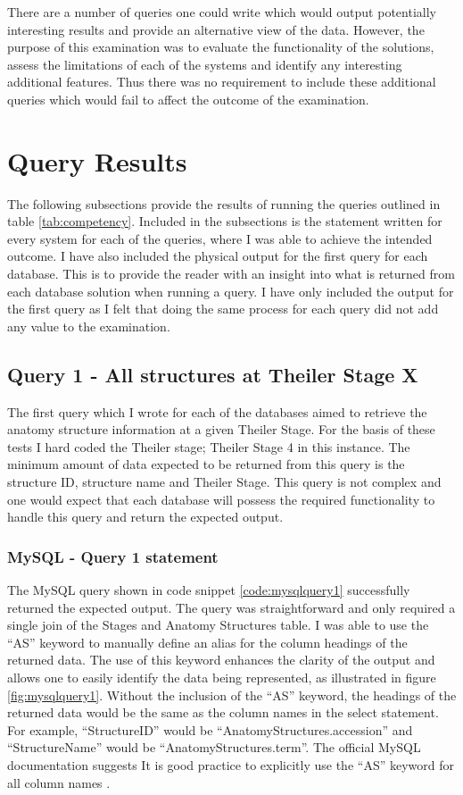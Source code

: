 There are a number of queries one could write which would output potentially interesting results and provide an alternative view of the data. However, the purpose of this examination was to evaluate the functionality of the solutions, assess the limitations of each of the systems and identify any interesting additional features. Thus there was no requirement to include these additional queries which would fail to affect the outcome of the examination.

\section{Query Results}\label{queryresults}
The following subsections provide the results of running the queries outlined in table \ref{tab:competency}. Included in the subsections is the statement written for every system for each of the queries, where I was able to achieve the intended outcome. I have also included the physical output for the first query for each database. This is to provide the reader with an insight into what is returned from each database solution when running a query. I have only included the output for the first query as I felt that doing the same process for each query did not add any value to the examination.

\subsection*{Query 1 - All structures at Theiler Stage X}\label{query1}
The first query which I wrote for each of the databases aimed to retrieve the anatomy structure information at a given Theiler Stage. For the basis of these tests I hard coded the Theiler stage; Theiler Stage 4 in this instance.  The minimum amount of data expected to be returned from this query is the structure ID, structure name and Theiler Stage. This query is not complex and one would expect that each database will possess the required functionality to handle this query and return the expected output.

\subsubsection*{MySQL - Query 1 statement}\label{mysqlquery1statement}
The MySQL query shown in code snippet \ref{code:mysqlquery1} successfully returned the expected output. The query was straightforward and only required a single join of the Stages and Anatomy Structures table. I was able to use the ``AS'' keyword to manually define an alias for the column headings of the returned data. The use of this keyword enhances the clarity of the output and allows one to easily identify the data being represented, as illustrated in figure \ref{fig:mysqlquery1}. Without the inclusion of the ``AS'' keyword, the headings of the returned data would be the same as the column names in the select statement. For example, ``StructureID'' would be ``AnatomyStructures.accession'' and ``StructureName'' would be ``AnatomyStructures.term''. The official MySQL documentation suggests It is good practice to explicitly use the ``AS'' keyword for all column names \cite{mysqlworkbench}.

